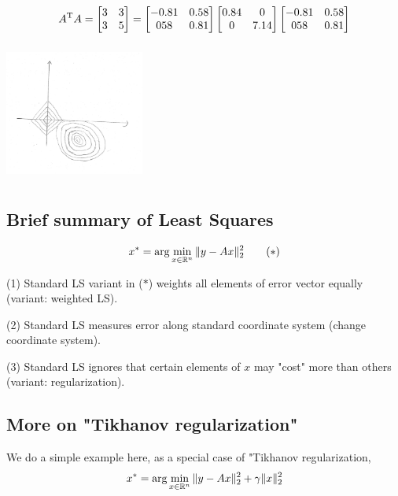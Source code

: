 $$A^{{\rm T}}A=
\begin{bmatrix}
3&3\\
3&5
\end{bmatrix}
=
\begin{bmatrix}
-0.81&0.58\\
058&0.81
\end{bmatrix}
\begin{bmatrix}
0.84&0\\
0&7.14
\end{bmatrix}
\begin{bmatrix}
-0.81&0.58\\
058&0.81
\end{bmatrix}
$$
\begin{marginfigure}
	\centering
	\includegraphics[width=1.8in,height=1.8in]{figures/ch06/ch06-08.jpg}
\end{marginfigure}


\subsection{Brief summary of Least Squares}
\begin{equation*}
x^* = \arg \min_{x\in \mathbb{R}^n}\Vert y-Ax\Vert_2^2 \qquad (*)
\end{equation*}

	(1) Standard LS variant in ($*$) weights all elements of error vector equally (variant: weighted LS).
	
	(2) Standard LS measures error along standard coordinate system (change coordinate system).
	
	(3) Standard LS ignores that certain elements of $x$ may "cost" more than others (variant: regularization).

\subsection{More on "Tikhanov regularization"}
We do a simple example here, as a special case of "Tikhanov regularization, 
\begin{equation*}
x^* = \arg\min_{x\in \mathbb{R}^n}\Vert y-Ax\Vert_2^2 + \gamma\Vert x\Vert_2^2
\end{equation*}

